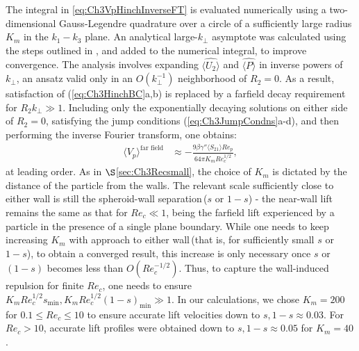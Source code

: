 \documentclass{jfm}
\begin{document}
The integral in \eqref{eq:Ch3VpHinchInverseFT} is evaluated numerically using a two-dimensional Gauss-Legendre quadrature over a circle of a sufficiently large radius $K_m$ in the $k_1\!-\!k_3$ plane. An analytical large-$k_\perp$ asymptote was calculated using the steps outlined in \cite{hogg1994}, and added to the numerical integral, to improve convergence. The analysis involves expanding $\hat{\langle U_2\rangle}$ and $\hat{\langle P\rangle}$ in inverse powers of $k_\perp$, an ansatz valid only in an $O(k_\perp^{-1})$ neighborhood of $R_2 = 0$. As a result, satisfaction of  (\ref{eq:Ch3HinchBC}a,b) is replaced by a farfield decay requirement for $R_2k_\perp \gg 1$. Including only the exponentially decaying solutions on either side of $R_2 = 0$, satisfying the jump conditions (\ref{eq:Ch3JumpCondns}a-d), and then performing the inverse Fourier transform, one obtains:
\begin{align}
\langle V_p\rangle^\text{far field}&\approx-\frac{9\beta\gamma''\langle S_{21}\rangle Re_p}{64\pi K_m Re_c^{1/2}},
\label{eq:Ch3Vplargek}
\end{align} 
 at leading order. As in $\S$\ref{sec:Ch3Recsmall}, the choice of $K_m$ is dictated by the distance of the particle from the walls. The relevant scale sufficiently close to either wall is still the spheroid-wall separation\,($s$ or $1-s$) - the near-wall lift remains the same as that for $Re_c\ll1$, being the farfield lift experienced by a particle in the presence of a single plane boundary. %
  While one needs to keep increasing $K_m$ with approach to either wall\,(that is, for sufficiently small $s$ or $1-s$), to obtain a converged result, this increase is only necessary once $s$ or $(1-s)$ becomes less than $O(Re_c^{-1/2})$. Thus, to capture the wall-induced repulsion for finite $Re_c$, one needs to ensure $K_m Re_c^{1/2} s_\text{min}, K_m Re_c^{1/2} (1-s)_\text{min}\gg1$. In our calculations, we chose $K_m=200$ for $0.1\leq Re_c\leq10$ to ensure accurate lift velocities down to $s, 1-s\approx0.03$. For $Re_c>10$, accurate lift profiles were obtained down to $s, 1-s\approx0.05$ for $K_m=40$. %
\end{document}
